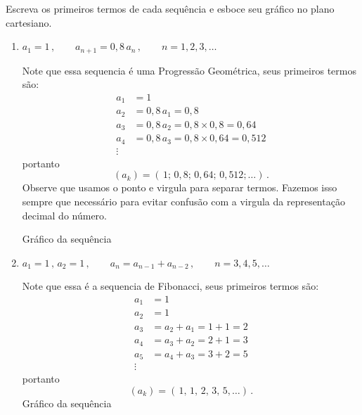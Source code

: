 \begin{example}
  Escreva os primeiros termos de cada sequência e esboce seu gráfico
  no plano cartesiano.
  \solution
  \begin{enumerate}

    \item \( a_1 = 1 \,,
      \qquad a_{n+1} = 0,8\, a_n \,,
      \qquad n = 1, 2, 3, \dots \) \par
    Note que essa sequencia é uma Progressão Geométrica,
    seus primeiros termos são:
    \begin{align*}
      a_1 & = 1 \\
      a_2 & = 0,8\, a_1 = 0,8 \\
      a_3 & = 0,8\, a_2 = 0,8 \times 0,8  = 0,64  \\
      a_4 & = 0,8\, a_3 = 0,8 \times 0,64 = 0,512 \\
      \vdots
    \end{align*}
    portanto
    \[
      (a_k) = \left(\, 1; \, 0,8; \, 0,64; \, 0,512; \dots \right) \,.
    \]
    Observe que usamos o ponto e virgula para separar termos.
    Fazemos isso sempre que necessário para evitar confusão com a virgula
    da representação decimal do número.

    Gráfico da sequência
    \begin{flushleft}
      
    \end{flushleft}

    \item \( a_1 = 1 \,, \, a_2 = 1 \,,
      \qquad a_{n} = a_{n-1} +  a_{n-2} \,,
      \qquad n = 3, 4, 5, \dots \) \par
    Note que essa é a sequencia de Fibonacci,
    seus primeiros termos são:
    \begin{align*}
      a_1 & = 1 \\
      a_2 & = 1\\
      a_3 & = a_2 + a_1 = 1 + 1 = 2 \\
      a_4 & = a_3 + a_2 = 2 + 1 = 3 \\
      a_5 & = a_4 + a_3 = 3 + 2 = 5 \\
      \vdots
    \end{align*}
    portanto
    \[
      (a_k) = \left(\, 1, \, 1, \, 2, \, 3, \, 5, \dots \right) \,.
    \]
    Gráfico da sequência
    \begin{flushleft}
      
    \end{flushleft}


\end{enumerate}
\end{example}
